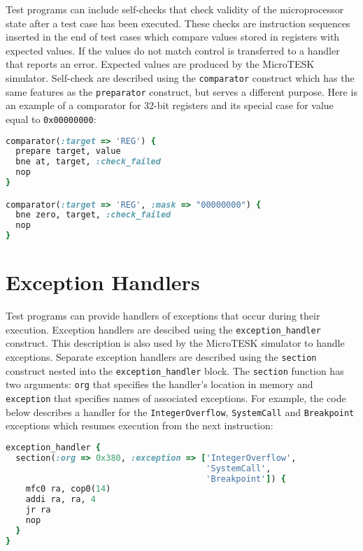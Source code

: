 \documentclass[oneside,final,12pt]{extreport}
\begin{document}
Test programs can include self-checks that check validity of the microprocessor state after
a test case has been executed. These checks are instruction sequences inserted in the end of
test cases which compare values stored in registers with expected values. If the values do not
match control is transferred to a handler that reports an error. Expected values are produced by
the MicroTESK simulator. Self-check are described using the  {\tt comparator} construct which has
the same features as the {\tt preparator} construct, but serves a different purpose. Here is
an example of a comparator for 32-bit registers and its special case for value equal to
{\tt 0x00000000}:

\begin{lstlisting}[language=ruby, emph={comparator, prepare}]
comparator(:target => 'REG') {
  prepare target, value
  bne at, target, :check_failed
  nop
}

comparator(:target => 'REG', :mask => "00000000") {
  bne zero, target, :check_failed
  nop
}
\end{lstlisting}


\section{Exception Handlers}

Test programs can provide handlers of exceptions that occur during their execution.
Exception handlers are descibed using the {\tt exception{\_}handler} construct.
This description is also used by the MicroTESK simulator to handle exceptions.
Separate exception handlers are described using the {\tt section} construct nested into
the {\tt exception{\_}handler} block. The {\tt section} function has two arguments: {\tt org}
that specifies the handler's location in memory and {\tt exception} that specifies names of
associated exceptions. For example, the code below describes a handler for
the {\tt IntegerOverflow}, {\tt SystemCall} and {\tt Breakpoint} exceptions which resumes
execution from the next instruction:

\begin{lstlisting}[language=ruby, emph={exception_handler, section}]
exception_handler {
  section(:org => 0x380, :exception => ['IntegerOverflow',
                                        'SystemCall',
                                        'Breakpoint']) {
    mfc0 ra, cop0(14)
    addi ra, ra, 4
    jr ra 
    nop
  }
}
\end{lstlisting}
\end{document}
